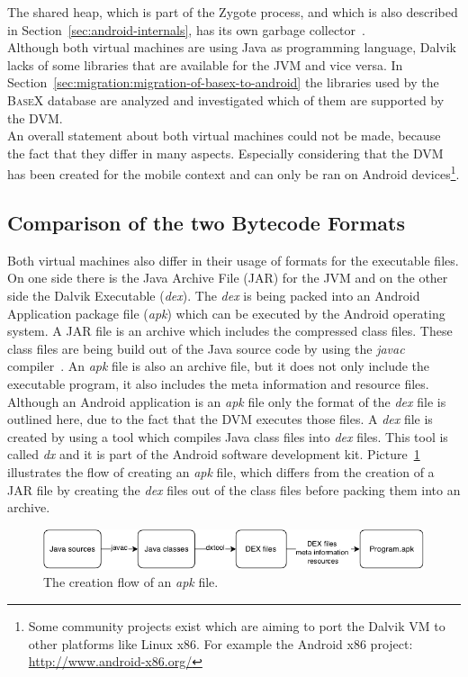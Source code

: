 The shared heap, which is part of the Zygote process, and which is also described in Section~\ref{sec:android-internals}, has its own garbage collector~\cite{maia2010evaluating}.
\\
Although both virtual machines are using Java as programming language, Dalvik lacks of some libraries that are available for the JVM and vice versa.
In Section~\ref{sec:migration:migration-of-basex-to-android} the libraries used by the \textsc{BaseX} database are analyzed and investigated which of them are supported by the DVM.\\
An overall statement about both virtual machines could not be made, because the fact that they differ in many aspects.
Especially considering that the DVM has been created for the mobile context and can only be ran on Android devices\footnote{Some community projects exist which are aiming to port the Dalvik VM to other platforms like Linux x86. For example the Android x86 project: \url{http://www.android-x86.org/}}.



\subsection{Comparison of the two Bytecode Formats}
\label{sec:comparison-of-the-two-bytecode-formats}
Both virtual machines also differ in their usage of formats for the executable files.
On one side there is the Java Archive File (JAR) for the JVM and on the other side the Dalvik Executable (\textit{dex}).
The \textit{dex} is being packed into an Android Application package file (\textit{apk}) which can be executed by the Android operating system.
A JAR file is an archive which includes the compressed class files. 
These class files are being build out of the Java source code by using the \textit{javac} compiler~\cite{pugh1999compressing}.
An \textit{apk} file is also an archive file, but it does not only include the executable program, it also includes the meta information and resource files.
Although an Android application is an \textit{apk} file only the format of the \textit{dex} file is outlined here, due to the fact that the DVM executes those files.
A \textit{dex} file is created by using a tool which compiles Java class files into \textit{dex} files.
This tool is called \textit{dx} and it is part of the Android software development kit.
Picture~\ref{fig:create-apk} illustrates the flow of creating an \textit{apk} file, which differs from the creation of a JAR file by creating the \textit{dex} files out of the class files before packing them into an archive.\\
\begin{figure}[h]
\begin{center}
\includegraphics[scale=0.55]{images/create-apk.png} 
\caption{The creation flow of an \textit{apk} file.}
\label{fig:create-apk}
\end{center}
\end{figure}

